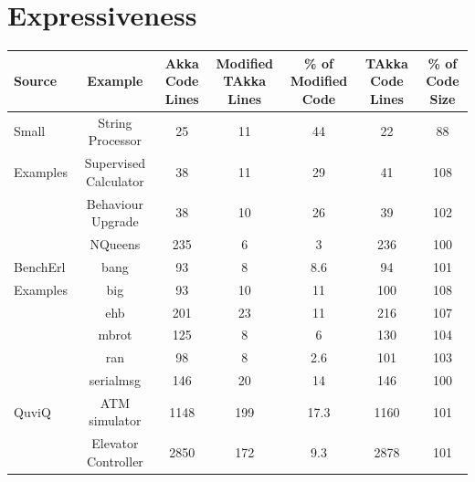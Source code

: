\section{Expressiveness}
\label{expressiveness}


\begin{table}[!ht]
\begin{center}
\begin{tabular}{| m{2.3 cm} | c | c | c |  c | c | c |}
\hline

Source & Example & \specialcell{Akka Code \\ Lines} &
\specialcell{Modified\\ TAkka Lines} & \specialcell{\% of \\Modified Code} &
\specialcell{TAkka Code\\ Lines}
& \specialcell{\% of \\Code Size} \\

\hline
Small   & String Processor & 25 & 11 & 44 & 22 & 88 \\
\cline{2-7}                            
Examples                            & Supervised Calculator &38 & 11 & 29 & 41 & 108 \\ 
\cline{2-7}
                            & Behaviour Upgrade & 38 & 10 & 26 & 39 & 102 \\
\cline{2-7}                            
                            & NQueens & 235 & 6 & 3 & 236 & 100 \\
\cline{2-7}                            
\hline

BenchErl  & bang & 93 & 8 & 8.6 & 94 & 101 \\
\cline{2-7}
Examples                            & big & 93 & 10 & 11 & 100 & 108 \\
\cline{2-7}                            
                            & ehb &201 & 23 & 11 & 216 & 107 \\ 
\cline{2-7}                            
                            & mbrot & 125 & 8 & 6 & 130 & 104 \\
\cline{2-7}                            
                            & ran & 98 & 8 & 2.6 & 101 & 103 \\
\cline{2-7}       
                            & serialmsg & 146 & 20 & 14 & 146 & 100 \\
\cline{2-7}       
\hline

\hline
QuviQ \cite{quviq} & ATM simulator & 1148 & 199 & 17.3 & 1160 & 101 \\
\cline{2-7}
                                     & Elevator Controller &
2850 & 172 & 9.3 & 2878 & 101 \\
\hline



\end{tabular}
\end{center}
\end{table}
